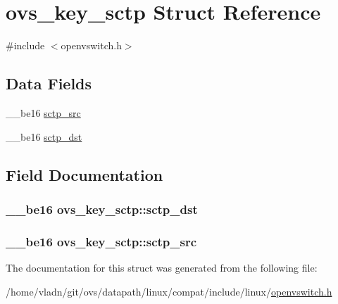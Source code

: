 \hypertarget{structovs__key__sctp}{}\section{ovs\+\_\+key\+\_\+sctp Struct Reference}
\label{structovs__key__sctp}


{\ttfamily \#include $<$openvswitch.\+h$>$}

\subsection*{Data Fields}
\begin{DoxyCompactItemize}
\item 
\+\_\+\+\_\+be16 \hyperlink{structovs__key__sctp_af10ce527eb1894b4080bd8024e82a1cc}{sctp\+\_\+src}
\item 
\+\_\+\+\_\+be16 \hyperlink{structovs__key__sctp_a1fa757d8e013ccfc5672df04cfa3aa7d}{sctp\+\_\+dst}
\end{DoxyCompactItemize}


\subsection{Field Documentation}
\hypertarget{structovs__key__sctp_a1fa757d8e013ccfc5672df04cfa3aa7d}{}
\subsubsection[{sctp\+\_\+dst}]{\setlength{\rightskip}{0pt plus 5cm}\+\_\+\+\_\+be16 ovs\+\_\+key\+\_\+sctp\+::sctp\+\_\+dst}\label{structovs__key__sctp_a1fa757d8e013ccfc5672df04cfa3aa7d}
\hypertarget{structovs__key__sctp_af10ce527eb1894b4080bd8024e82a1cc}{}
\subsubsection[{sctp\+\_\+src}]{\setlength{\rightskip}{0pt plus 5cm}\+\_\+\+\_\+be16 ovs\+\_\+key\+\_\+sctp\+::sctp\+\_\+src}\label{structovs__key__sctp_af10ce527eb1894b4080bd8024e82a1cc}


The documentation for this struct was generated from the following file\+:\begin{DoxyCompactItemize}
\item 
/home/vladn/git/ovs/datapath/linux/compat/include/linux/\hyperlink{openvswitch_8h}{openvswitch.\+h}\end{DoxyCompactItemize}
